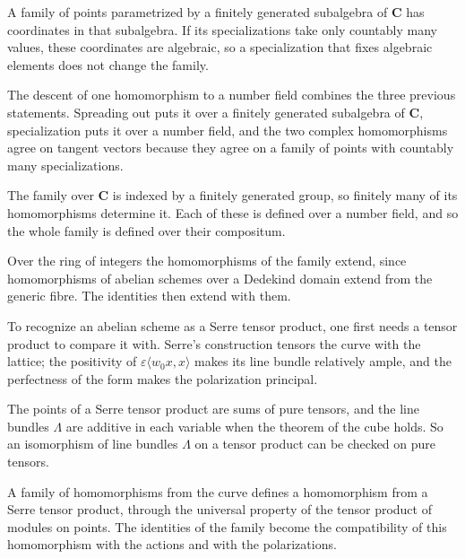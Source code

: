 A family of points parametrized by a finitely generated subalgebra of $\mathbf C$ has coordinates in that subalgebra.
If its specializations take only countably many values, these coordinates are algebraic, so a specialization that
fixes algebraic elements does not change the family.

The descent of one homomorphism to a number field combines the three previous statements. Spreading out puts it over a
finitely generated subalgebra of $\mathbf C$, specialization puts it over a number field, and the two complex
homomorphisms agree on tangent vectors because they agree on a family of points with countably many specializations.

The family over $\mathbf C$ is indexed by a finitely generated group, so finitely many of its homomorphisms determine
it. Each of these is defined over a number field, and so the whole family is defined over their compositum.

Over the ring of integers the homomorphisms of the family extend, since homomorphisms of abelian schemes over a
Dedekind domain extend from the generic fibre. The identities then extend with them.

To recognize an abelian scheme as a Serre tensor product, one first needs a tensor product to compare it with. Serre's
construction tensors the curve with the lattice; the positivity of $\varepsilon\langle w_0x,x\rangle$ makes its line
bundle relatively ample, and the perfectness of the form makes the polarization principal.

The points of a Serre tensor product are sums of pure tensors, and the line bundles $\Lambda$ are additive in each
variable when the theorem of the cube holds. So an isomorphism of line bundles $\Lambda$ on a tensor product can be
checked on pure tensors.

A family of homomorphisms from the curve defines a homomorphism from a Serre tensor product, through the universal
property of the tensor product of modules on points. The identities of the family become the compatibility of this
homomorphism with the actions and with the polarizations.

